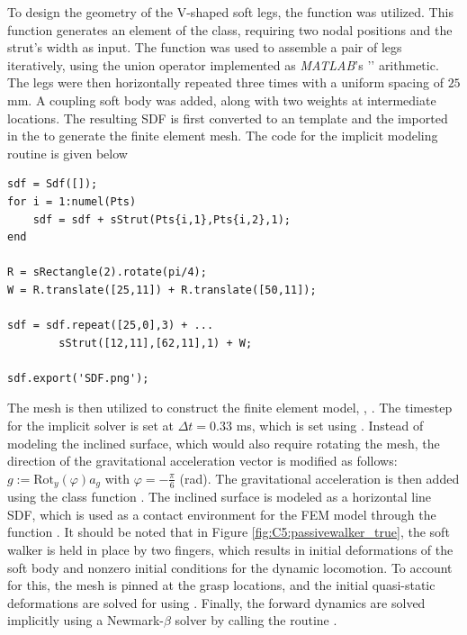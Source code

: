 To design the geometry of the V-shaped soft legs, the  function was utilized. This function generates an element of the  class, requiring two nodal positions  and the strut's width  as input. The function was used to assemble a pair of legs iteratively, using the union operator implemented as \textit{MATLAB}'s '\code{+}' arithmetic. The legs were then horizontally repeated three times with a uniform spacing of $25$ \si{\milli \metre}. A coupling soft body was added, along with two weights at intermediate locations. The resulting SDF is first converted to an  template and the imported in the  to generate the finite element mesh. The code for the implicit modeling routine is given below

\begin{lstlisting}[style=matlab] 
sdf = Sdf([]);
for i = 1:numel(Pts)
    sdf = sdf + sStrut(Pts{i,1},Pts{i,2},1);
end

R = sRectangle(2).rotate(pi/4);
W = R.translate([25,11]) + R.translate([50,11]);

sdf = sdf.repeat([25,0],3) + ... 
        sStrut([12,11],[62,11],1) + W;

sdf.export('SDF.png');        
\end{lstlisting}

The mesh is then utilized to construct the finite element model, \ie, . The timestep for the implicit solver is set at $\Delta t = 0.33$ \si{\milli \second}, which is set using . Instead of modeling the inclined surface, which would also require rotating the mesh, the direction of the gravitational acceleration vector is modified as follows: $g := \textrm{Rot}_y(\varphi) a_g$ with $\varphi = -\frac{\pi}{6}$ (rad). The gravitational acceleration is then added using the class function . The inclined surface is modeled as a horizontal line SDF, which is used as a contact environment for the FEM model through the function . It should be noted that in Figure \ref{fig:C5:passivewalker_true}, the soft walker is held in place by two fingers, which results in initial deformations of the soft body and nonzero initial conditions for the dynamic locomotion. To account for this, the mesh is pinned at the grasp locations, and the initial quasi-static deformations are solved for using . Finally, the forward dynamics are solved implicitly using a Newmark-$\beta$ solver by calling the routine .

